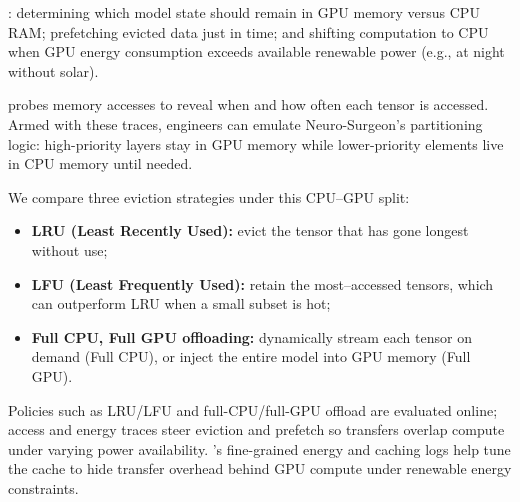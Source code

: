 : determining which model state should remain in GPU memory versus CPU RAM; prefetching evicted data just in time; and shifting computation to CPU when GPU energy consumption exceeds available renewable power (e.g., at night without solar).

\sys{} probes memory accesses to reveal when and how often each tensor is accessed. Armed with these traces, engineers can emulate Neuro-Surgeon's partitioning logic: high-priority layers stay in GPU memory while lower-priority elements live in CPU memory until needed.

We compare three  eviction strategies under this CPU–GPU split:
\begin{itemize}[leftmargin=*,itemsep=0pt]
\item \textbf{LRU (Least Recently Used):} evict the tensor that has gone longest without use;
\item \textbf{LFU (Least Frequently Used):} retain the most–accessed tensors, which can outperform LRU when a small subset is hot;
\item \textbf{Full CPU, Full GPU offloading:} dynamically stream each tensor on demand (Full CPU), or inject the entire model into GPU memory (Full GPU).
\end{itemize}

Policies such as LRU/LFU and full-CPU/full-GPU offload are evaluated online; access and energy traces steer eviction and prefetch so transfers overlap compute under varying power availability. \sys's fine-grained energy and caching logs help tune the cache to hide transfer overhead behind GPU compute under renewable energy constraints.

